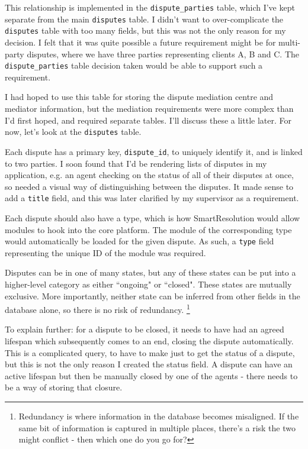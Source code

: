 This relationship is implemented in the \lstinline{dispute_parties} table, which I've kept separate from the main \lstinline{disputes} table. I didn't want to over-complicate the \lstinline{disputes} table with too many fields, but this was not the only reason for my decision. I felt that it was quite possible a future requirement might be for multi-party disputes, where we have three parties representing clients A, B and C. The \lstinline{dispute_parties} table decision taken would be able to support such a requirement.

I had hoped to use this table for storing the dispute mediation centre and mediator information, but the mediation requirements were more complex than I'd first hoped, and required separate tables. I'll discuss these a little later. For now, let's look at the \lstinline{disputes} table.

Each dispute has a primary key, \lstinline{dispute_id}, to uniquely identify it, and is linked to two parties. I soon found that I'd be rendering lists of disputes in my application, e.g. an agent checking on the status of all of their disputes at once, so needed a visual way of distinguishing between the disputes. It made sense to add a \lstinline{title} field, and this was later clarified by my supervisor as a requirement.

Each dispute should also have a type, which is how SmartResolution would allow modules to hook into the core platform. The module of the corresponding type would automatically be loaded for the given dispute. As such, a \lstinline{type} field representing the unique ID of the module was required.

Disputes can be in one of many states, but any of these states can be put into a higher-level category as either ``ongoing" or ``closed". These states are mutually exclusive. More importantly, neither state can be inferred from other fields in the database alone, so
there is no risk of redundancy. \footnote{Redundancy is where information in the database becomes misaligned. If the same bit of information is captured in multiple places, there's a risk the two might conflict - then which one do you go for?}

To explain further: for a dispute to be closed, it needs to have had an agreed lifespan which subsequently comes to an end, closing the dispute automatically. This is a complicated query, to have to make just to get the status of a dispute, but this is not the only reason I created the status field. A dispute can have an active lifespan but then be manually closed by one of the agents - there needs to be a way of storing that closure.

